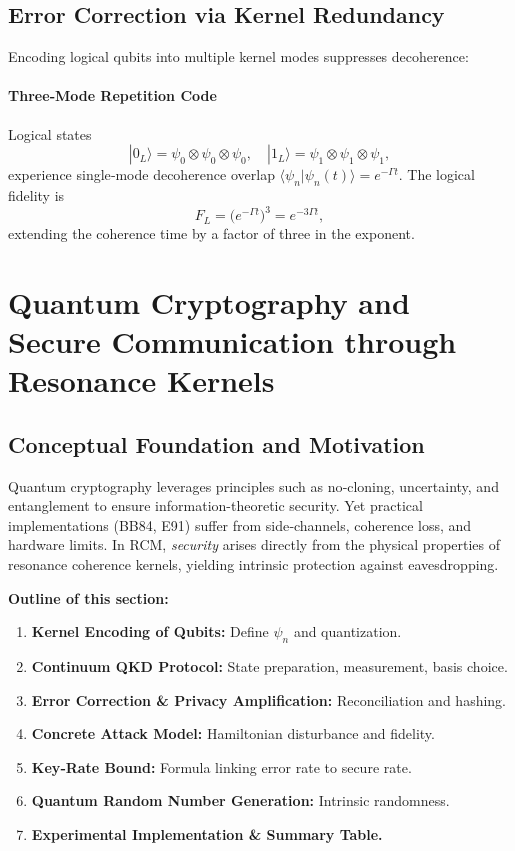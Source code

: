 \subsection{Error Correction via Kernel Redundancy}

Encoding logical qubits into multiple kernel modes suppresses decoherence:

\paragraph{Three‐Mode Repetition Code}
Logical states
\[
|0_L\rangle = \psi_0\otimes\psi_0\otimes\psi_0,
\quad
|1_L\rangle = \psi_1\otimes\psi_1\otimes\psi_1,
\]
experience single‐mode decoherence overlap
$\langle\psi_n|\psi_n(t)\rangle=e^{-\Gamma t}$.
The logical fidelity is
\begin{equation}\label{eq:overlap_suppression}
F_L = \bigl(e^{-\Gamma t}\bigr)^3 = e^{-3\Gamma t},
\end{equation}
extending the coherence time by a factor of three in the exponent.


\section{Quantum Cryptography and Secure Communication through Resonance Kernels}

\subsection{Conceptual Foundation and Motivation}

Quantum cryptography leverages principles such as no‐cloning, uncertainty, and entanglement to ensure information-theoretic security. Yet practical implementations (BB84, E91) suffer from side‐channels, coherence loss, and hardware limits. In RCM, \emph{security} arises directly from the physical properties of resonance coherence kernels, yielding intrinsic protection against eavesdropping.

\vspace{0.5em}
\noindent\textbf{Outline of this section:}
\begin{enumerate}
  \item \textbf{Kernel Encoding of Qubits:} Define $\psi_n$ and quantization.
  \item \textbf{Continuum QKD Protocol:} State preparation, measurement, basis choice.
  \item \textbf{Error Correction \& Privacy Amplification:} Reconciliation and hashing.
  \item \textbf{Concrete Attack Model:} Hamiltonian disturbance and fidelity.
  \item \textbf{Key‐Rate Bound:} Formula linking error rate to secure rate.
  \item \textbf{Quantum Random Number Generation:} Intrinsic randomness.
  \item \textbf{Experimental Implementation \& Summary Table.}
\end{enumerate}

